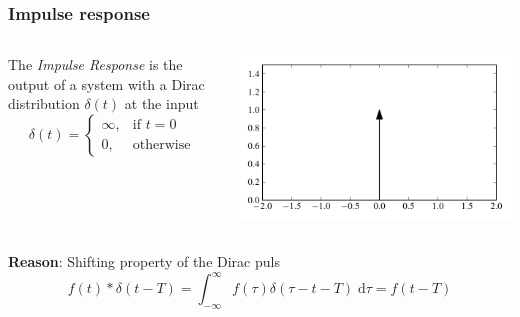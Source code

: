 \begin{frame}
    \frametitle{Impulse response}

    \begin{columns}[c, onlytextwidth]
        \begin{column}{.48\linewidth}
            \hspace{1.2cm}\begin{myDefinition}
                The \textit{Impulse Response} is the output of a system with a Dirac distribution $\delta(t)$ at the input
                \begin{equation*}
                    \delta(t) = \begin{cases}
                        \infty, & \text{if } t = 0 \\
                        0,      & \text{otherwise}
                    \end{cases}
                \end{equation*}
            \end{myDefinition}
        \end{column}
        \hfill{}%
        \begin{column}{.48\linewidth}
            \begin{center}

                \includegraphics[height=.45\textheight]{images/dirac_t.pdf}
            \end{center}
        \end{column}
    \end{columns}

    \vspace{0.5cm}
    \textbf{Reason}: Shifting property of the Dirac puls
    \begin{equation*}
        f(t) * \delta(t-T) = \int_{-\infty}^{\infty}{f(\tau)\delta(\tau - t - T)\; \mathrm{d}\tau} = f(t-T)
    \end{equation*}

\end{frame}

